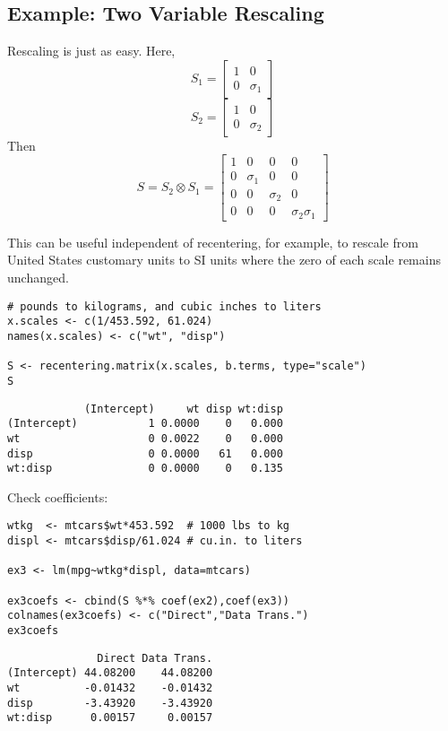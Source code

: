 \documentclass[]{article}
\begin{document}
\hypertarget{example-two-variable-rescaling}{%
\subsection{Example: Two Variable
Rescaling}\label{example-two-variable-rescaling}}

Rescaling is just as easy. Here,
\[S_1=\begin{bmatrix}1 &0 \\ 0 &\sigma_1 \end{bmatrix}\]
\[S_2=\begin{bmatrix}1 &0 \\ 0 &\sigma_2 \end{bmatrix}\] Then
\[S = S_2 \otimes S_1 = \begin{bmatrix} 1 &0 &0 &0 \\
  0 &\sigma_1 &0 &0 \\ 0 &0 &\sigma_2 &0 \\ 0 &0 &0 &\sigma_2\sigma_1 \end{bmatrix}\]

This can be useful independent of recentering, for example, to rescale
from United States customary units to SI units where the zero of each
scale remains unchanged.

\begin{verbatim}
# pounds to kilograms, and cubic inches to liters
x.scales <- c(1/453.592, 61.024)
names(x.scales) <- c("wt", "disp")
  
S <- recentering.matrix(x.scales, b.terms, type="scale")
S
\end{verbatim}

\begin{verbatim}
            (Intercept)     wt disp wt:disp
(Intercept)           1 0.0000    0   0.000
wt                    0 0.0022    0   0.000
disp                  0 0.0000   61   0.000
wt:disp               0 0.0000    0   0.135
\end{verbatim}

Check coefficients:

\begin{verbatim}
wtkg  <- mtcars$wt*453.592  # 1000 lbs to kg
displ <- mtcars$disp/61.024 # cu.in. to liters

ex3 <- lm(mpg~wtkg*displ, data=mtcars)

ex3coefs <- cbind(S %*% coef(ex2),coef(ex3))
colnames(ex3coefs) <- c("Direct","Data Trans.")
ex3coefs
\end{verbatim}

\begin{verbatim}
              Direct Data Trans.
(Intercept) 44.08200    44.08200
wt          -0.01432    -0.01432
disp        -3.43920    -3.43920
wt:disp      0.00157     0.00157
\end{verbatim}
\end{document}
